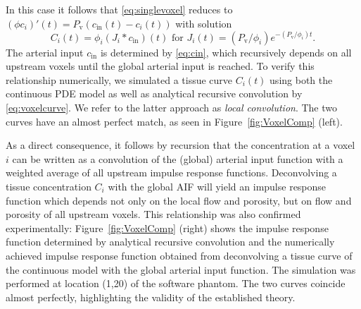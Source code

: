 \documentclass[journal,twocolumn]{IEEEtran}
\newcommand{\ca}{c_\mathrm{a}}
\newcommand{\Perfv}{P_{\mathrm{v}}}
\begin{document}

	In this case it follows that \eqref{eq:singlevoxel} reduces to $(\phi c_i)'(t) = \Perfv (c_\mathrm{in}(t) - c_i(t))$ 
	with solution
	\begin{equation}\label{eq:voxelcurve}
		C_i(t) = \phi_i(J_i*c_{\mathrm{in}})(t)
			\text{ for } J_i(t)=(\Perfv/\phi_i)e^{- (\Perfv/\phi_i)t}.
	\end{equation}
	The arterial input $c_{\mathrm{in}}$ is determined by \eqref{eq:cin}, which recursively depends on all upstream voxels until the global arterial input is reached.
	To verify this relationship numerically, we simulated a tissue curve $C_i(t)$ using both the continuous PDE model as well as analytical recursive convolution by \eqref{eq:voxelcurve}.
	We refer to the latter approach as \textit{local convolution}. The two curves have an almost perfect match, as seen in Figure~\ref{fig:VoxelComp} (left).	

	As a direct consequence, it follows by recursion that the concentration at a voxel $i$ can be written as a convolution of the (global) arterial input function with a weighted average of all upstream impulse response functions.
	Deconvolving a tissue concentration $C_i$ with the global AIF will yield an impulse response function which depends not only on the local flow and porosity, but on flow and porosity of all upstream voxels.
	This relationship was also confirmed experimentally: Figure~\ref{fig:VoxelComp} (right) shows the impulse response function determined by analytical recursive convolution and the numerically achieved impulse response function obtained from deconvolving a tissue curve of the continuous model with the global arterial input function. 
	The simulation was performed at location (1,20) of the software phantom.
	The two curves coincide almost perfectly, highlighting the validity of the established theory.
\end{document}
